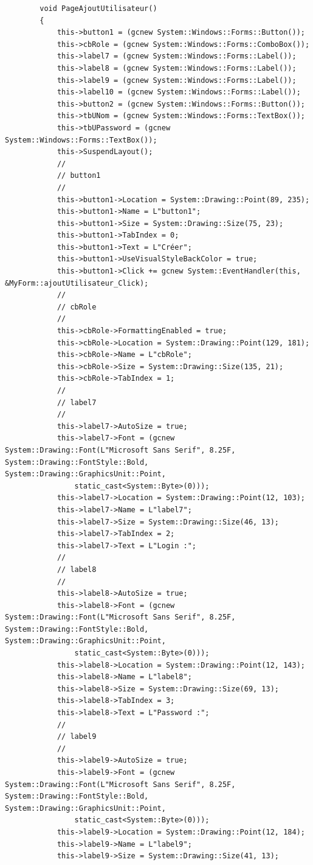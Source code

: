\documentclass[main.tex]{subfiles}
\begin{document}
\begin{lstlisting}
		void PageAjoutUtilisateur()
		{
			this->button1 = (gcnew System::Windows::Forms::Button());
			this->cbRole = (gcnew System::Windows::Forms::ComboBox());
			this->label7 = (gcnew System::Windows::Forms::Label());
			this->label8 = (gcnew System::Windows::Forms::Label());
			this->label9 = (gcnew System::Windows::Forms::Label());
			this->label10 = (gcnew System::Windows::Forms::Label());
			this->button2 = (gcnew System::Windows::Forms::Button());
			this->tbUNom = (gcnew System::Windows::Forms::TextBox());
			this->tbUPassword = (gcnew System::Windows::Forms::TextBox());
			this->SuspendLayout();
			// 
			// button1
			// 
			this->button1->Location = System::Drawing::Point(89, 235);
			this->button1->Name = L"button1";
			this->button1->Size = System::Drawing::Size(75, 23);
			this->button1->TabIndex = 0;
			this->button1->Text = L"Créer";
			this->button1->UseVisualStyleBackColor = true;
			this->button1->Click += gcnew System::EventHandler(this, &MyForm::ajoutUtilisateur_Click);
			// 
			// cbRole
			// 
			this->cbRole->FormattingEnabled = true;
			this->cbRole->Location = System::Drawing::Point(129, 181);
			this->cbRole->Name = L"cbRole";
			this->cbRole->Size = System::Drawing::Size(135, 21);
			this->cbRole->TabIndex = 1;
			// 
			// label7
			// 
			this->label7->AutoSize = true;
			this->label7->Font = (gcnew System::Drawing::Font(L"Microsoft Sans Serif", 8.25F, System::Drawing::FontStyle::Bold, System::Drawing::GraphicsUnit::Point,
				static_cast<System::Byte>(0)));
			this->label7->Location = System::Drawing::Point(12, 103);
			this->label7->Name = L"label7";
			this->label7->Size = System::Drawing::Size(46, 13);
			this->label7->TabIndex = 2;
			this->label7->Text = L"Login :";
			// 
			// label8
			// 
			this->label8->AutoSize = true;
			this->label8->Font = (gcnew System::Drawing::Font(L"Microsoft Sans Serif", 8.25F, System::Drawing::FontStyle::Bold, System::Drawing::GraphicsUnit::Point,
				static_cast<System::Byte>(0)));
			this->label8->Location = System::Drawing::Point(12, 143);
			this->label8->Name = L"label8";
			this->label8->Size = System::Drawing::Size(69, 13);
			this->label8->TabIndex = 3;
			this->label8->Text = L"Password :";
			// 
			// label9
			// 
			this->label9->AutoSize = true;
			this->label9->Font = (gcnew System::Drawing::Font(L"Microsoft Sans Serif", 8.25F, System::Drawing::FontStyle::Bold, System::Drawing::GraphicsUnit::Point,
				static_cast<System::Byte>(0)));
			this->label9->Location = System::Drawing::Point(12, 184);
			this->label9->Name = L"label9";
			this->label9->Size = System::Drawing::Size(41, 13);

\end{lstlisting}
\end{document}
